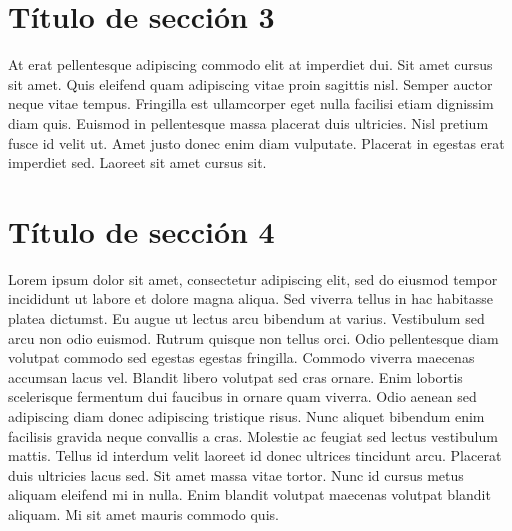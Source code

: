 \section{Título de sección 3}

At erat pellentesque adipiscing commodo elit at imperdiet dui. Sit amet cursus sit amet. Quis eleifend quam adipiscing vitae proin sagittis nisl. Semper auctor neque vitae tempus. Fringilla est ullamcorper eget nulla facilisi etiam dignissim diam quis. Euismod in pellentesque massa placerat duis ultricies. Nisl pretium fusce id velit ut. Amet justo donec enim diam vulputate. Placerat in egestas erat imperdiet sed. Laoreet sit amet cursus sit.

\section{Título de sección 4}

Lorem ipsum dolor sit amet, consectetur adipiscing elit, sed do eiusmod tempor incididunt ut labore et dolore magna aliqua. Sed viverra tellus in hac habitasse platea dictumst. Eu augue ut lectus arcu bibendum at varius. Vestibulum sed arcu non odio euismod. Rutrum quisque non tellus orci. Odio pellentesque diam volutpat commodo sed egestas egestas fringilla. Commodo viverra maecenas accumsan lacus vel. Blandit libero volutpat sed cras ornare. Enim lobortis scelerisque fermentum dui faucibus in ornare quam viverra. Odio aenean sed adipiscing diam donec adipiscing tristique risus. Nunc aliquet bibendum enim facilisis gravida neque convallis a cras. Molestie ac feugiat sed lectus vestibulum mattis. Tellus id interdum velit laoreet id donec ultrices tincidunt arcu. Placerat duis ultricies lacus sed. Sit amet massa vitae tortor. Nunc id cursus metus aliquam eleifend mi in nulla. Enim blandit volutpat maecenas volutpat blandit aliquam. Mi sit amet mauris commodo quis.
